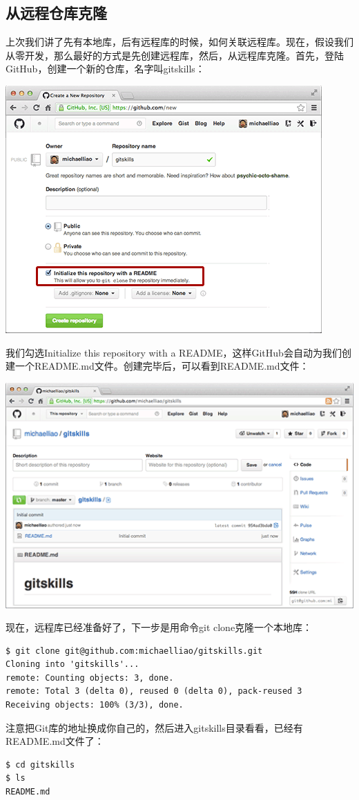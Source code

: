 \documentclass[•]{article}
\begin{document}
\begin{CJK}{UTF8}{gbsn}
\subsection{从远程仓库克隆}
\qquad 上次我们讲了先有本地库，后有远程库的时候，如何关联远程库。现在，假设我们从零开发，那么最好的方式是先创建远程库，然后，从远程库克隆。首先，登陆GitHub，创建一个新的仓库，名字叫gitskills：
\begin{center}
\includegraphics[scale=0.6]{github-init-repo.png}
\end{center}
\qquad 我们勾选Initialize this repository with a README，这样GitHub会自动为我们创建一个README.md文件。创建完毕后，可以看到README.md文件：
\begin{center}
\includegraphics[scale=0.6]{github-init-repo-2}
\end{center}
\qquad 现在，远程库已经准备好了，下一步是用命令git clone克隆一个本地库：
\begin{lstlisting}
$ git clone git@github.com:michaelliao/gitskills.git
Cloning into 'gitskills'...
remote: Counting objects: 3, done.
remote: Total 3 (delta 0), reused 0 (delta 0), pack-reused 3
Receiving objects: 100% (3/3), done.
\end{lstlisting}
注意把Git库的地址换成你自己的，然后进入gitskills目录看看，已经有README.md文件了：
\begin{lstlisting}
$ cd gitskills
$ ls
README.md
\end{lstlisting}


\end{CJK}
\end{document}
